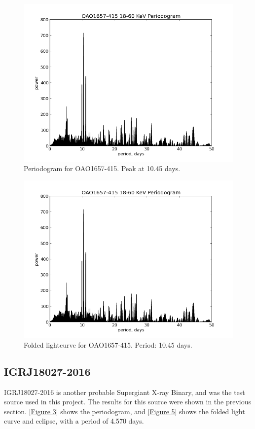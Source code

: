 \begin{figure}[h!]
\centering
\includegraphics[width=130mm]{gfx/Fig12.png}
\caption{Periodogram for OAO1657-415. Peak at 10.45 days.}
\label{Figure 12}
\end{figure} 

\begin{figure}[h!]
\centering
\includegraphics[width=130mm]{gfx/Fig12.png}
\caption{Folded lightcurve for OAO1657-415. Period: 10.45 days.}
\label{Figure 13}
\end{figure} 

\subsection{IGRJ18027-2016}
IGRJ18027-2016 is another probable Supergiant X-ray Binary, and was the test source used in this project. The results for this source were shown in the previous section. \ref{Figure 3} shows the periodogram, and \ref{Figure 5} shows the folded light curve and eclipse, with a period of 4.570 days. 

\clearpage

